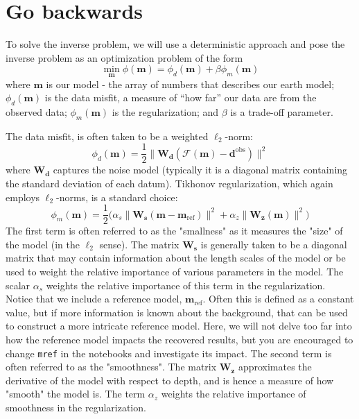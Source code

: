 \documentclass[11pt,oneside]{article}
\begin{document}
\section{Go backwards}

To solve the inverse problem, we will use a deterministic approach and pose the inverse problem as an optimization problem of the form
\begin{equation}
\min_{\mathbf{m}} \phi(\mathbf{m}) = \phi_d(\mathbf{m}) + \beta\phi_m(\mathbf{m})
\end{equation}
where $\mathbf{m}$ is our model - the array of numbers that describes our earth model; $\phi_d(\mathbf{m})$ is the data misfit, a measure of ``how far'' our data are from the observed data; $\phi_m(\mathbf{m})$ is the regularization; and $\beta$ is a trade-off parameter.

The data misfit, is often taken to be a weighted $\ell_2$-norm:
\begin{equation}
\phi_d(\mathbf{m}) = \frac{1}{2}\|\mathbf{W_d} (\mathcal{F}(\mathbf{m}) - \mathbf{d}^{\text{obs}})\|^2
\end{equation}
where $\mathbf{W_d}$ captures the noise model (typically it is a diagonal matrix containing the standard deviation of each datum). Tikhonov regularization, which again employs $\ell_2$-norms, is a standard choice:
\begin{equation}
\phi_m(\mathbf{m}) = \frac{1}{2}\big(\alpha_s\|\mathbf{W_s} (\mathbf{m} - \mathbf{m}_{\text{ref}})\|^2 + \alpha_z\|\mathbf{W_z} (\mathbf{m})\|^2 \big)
\end{equation}
The first term is often referred to as the "smallness" as it measures the "size" of the model (in the $\ell_2$ sense). The matrix $\mathbf{W_s}$ is generally taken to be a diagonal matrix that may contain information about the length scales of the model or be used to weight the relative importance of various parameters in the model. The scalar $\alpha_s$ weights the relative importance of this term in the regularization. Notice that we include a reference model, $\mathbf{m}_{\text{ref}}$. Often this is defined as a constant value, but if more information is known about the background, that can be used to construct a more intricate reference model. Here, we will not delve too far into how the reference model impacts the recovered results, but you are encouraged to change \texttt{mref} in the notebooks and investigate its impact. The second term is often referred to as the "smoothness". The matrix $\mathbf{W_z}$ approximates the derivative of the model with respect to depth, and is hence a measure of how "smooth" the model is. The term $\alpha_z$ weights the relative importance of smoothness in the regularization.
\end{document}
